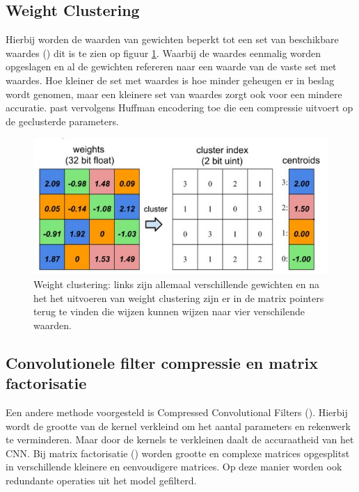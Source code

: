 \subsection{Weight Clustering}
Hierbij worden de waarden van gewichten beperkt tot een set van beschikbare waardes (\cite{han_deep_2016}) dit is te zien op figuur \ref{fig:clus}.
Waarbij de waardes eenmalig worden opgeslagen en al de gewichten refereren naar een waarde van de vaste set met waardes.
Hoe kleiner de set met waardes is hoe minder geheugen er in beslag wordt genomen, maar een kleinere set van waardes zorgt ook voor een mindere accuratie.
\cite{han_deep_2016} past vervolgens Huffman encodering toe die een compressie uitvoert op de geclusterde parameters.

\begin{figure}[!ht]
	\centering
	\includegraphics[width=0.7\linewidth]{fig/clus.jpg}
	\caption{Weight clustering: links zijn allemaal verschillende gewichten en na het het uitvoeren van weight clustering zijn er in de matrix pointers terug te vinden die wijzen kunnen wijzen naar vier verschilende waarden.}
	\label{fig:clus}
\end{figure}

\subsection{Convolutionele filter compressie en matrix factorisatie}
Een andere methode voorgesteld is Compressed Convolutional Filters (\cite{goel_survey_2020}).
Hierbij wordt de grootte van de kernel verkleind om het aantal parameters en rekenwerk te verminderen.
Maar door de kernels te verkleinen daalt de accuraatheid van het CNN.
Bij matrix factorisatie (\cite{goel_survey_2020}) worden grootte en complexe matrices opgesplitst in verschillende kleinere en eenvoudigere matrices.
Op deze manier worden ook redundante operaties uit het model gefilterd.

